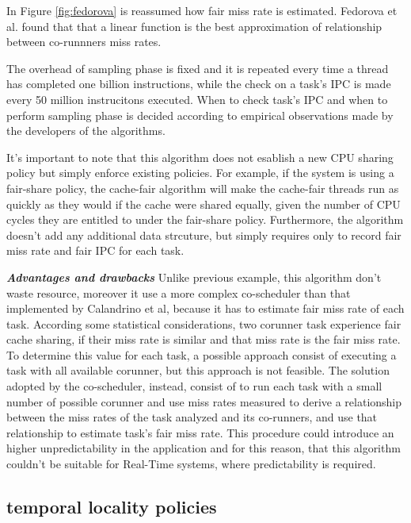 \begin{description}
In Figure \ref{fig:fedorova} is reassumed how fair miss rate is estimated. Fedorova et al. found that that a linear function is the best approximation of 
relationship between co-runnners miss rates.

The overhead of sampling phase is fixed and it is repeated every time a thread has completed one billion instructions, while the check on a task's IPC
is made every 50 million instrucitons executed. When to check task's IPC and when to perform sampling phase is decided according to empirical observations
made by the developers of the algorithms.

It's important to note that this algorithm does not esablish a new CPU sharing policy but simply enforce existing policies. For example, if the 
system is using a fair-share policy, the cache-fair algorithm will make the cache-fair threads run as quickly as they would if the cache were shared 
equally, given the number of CPU cycles they are entitled to under the fair-share policy. Furthermore, the algorithm doesn't add any additional data 
strcuture, but simply requires only to record fair miss rate and fair IPC for each task.

\textbf{\textit{Advantages and drawbacks}}
Unlike previous example, this algorithm don't waste resource, moreover it use a more complex co-scheduler than that implemented by Calandrino et al, 
because it has to estimate fair miss rate of each task. According some statistical considerations, two corunner task experience fair cache sharing, if 
their miss rate is similar and that miss rate is the fair miss rate. To determine this value for each task, a possible approach consist of executing a task 
with all available corunner, but this approach is not feasible. The solution adopted by the co-scheduler, instead, consist of to run each task with a small 
number of possible corunner and use miss rates measured to derive a relationship between the miss rates of the task analyzed and its co-runners, and use 
that relationship to estimate task's fair miss rate. This procedure could introduce an higher unpredictability in the application and for this reason, that 
this algorithm couldn't be suitable for Real-Time systems, where predictability is required.

\end{description}

\subsection{temporal locality policies} 

